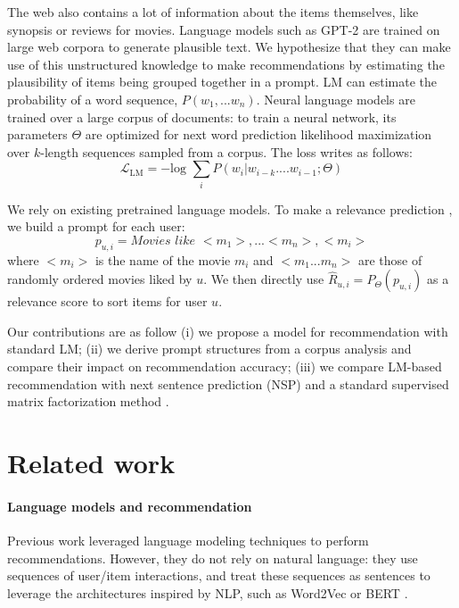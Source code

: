 \documentclass[runningheads]{llncs}
\begin{document}
\vspace{-0.5cm}
The web also contains a lot of information about the items themselves, like synopsis or reviews for movies. Language models such as GPT-2 \cite{radford2019language} are trained on large web corpora to generate plausible text. We hypothesize that they can make use of this unstructured knowledge to make recommendations by estimating the plausibility of items being grouped together in a prompt. LM can estimate the probability of a word sequence, $P(w_1,...w_n)$.  Neural language models are trained over a large corpus of documents: to train a neural network, its parameters $\Theta$ are optimized for next word prediction likelihood maximization over $k$-length sequences sampled from a corpus. The loss writes as follows:
\begin{equation}
\mathcal{L}_\text{LM} = - \text{log } \sum\limits_{i} P (w_i|w_{i-k}....w_{i-1};\Theta) \label{eq:languagemodeling}
\end{equation}

We rely on existing pretrained language models. To make a relevance prediction , we build a prompt for each user:
\vspace{-0.2cm}
\begin{equation}
p_{u,i}= \textit{Movies like } {<}m_1{>},...{<}m_n{>}, {<}m_i{>} 
\end{equation}
where ${<}m_i{>}$ is the name of the movie $m_i$ and ${<}m_1...m_n{>}$ are those of randomly ordered movies liked by $u$. We then directly use $\widehat{R}_{u,i} =P_\Theta(p_{u,i})$ as a relevance score to sort items for user $u$.

Our contributions are as follow (i) we propose a model for recommendation with standard LM; (ii) we derive prompt structures from a corpus analysis and compare their impact on recommendation accuracy; (iii) we compare LM-based recommendation with next sentence prediction (NSP) \cite{Penha20} and a standard supervised matrix factorization method \cite{koren2009matrix,rendle2012bpr}.

\section{Related work}

\paragraph{\textbf{Language models and recommendation}}  
Previous work leveraged language modeling techniques to perform recommendations. However, they do not rely on natural language: they use sequences of user/item interactions, and treat these sequences as sentences to leverage the architectures inspired by NLP, such as Word2Vec \cite{guardia2015latent,barkan2017item2vec,devooght2017long,li2018learning} or BERT \cite{BERT4Recs}. \vspace{-0.15cm}
\end{document}
